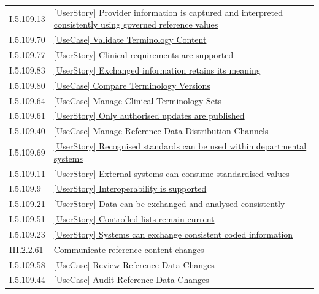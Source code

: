 \begin{longtable}{p{.22\linewidth}p{.73\linewidth}}
I.5.109.13 & \hyperref[element:73ed5dc7bd934953845142a11a9b709e]{[UserStory] Provider information is captured and interpreted consistently using governed reference values} \\
I.5.109.70 & \hyperref[element:7480697092b94fc5a2c8a50901bc6433]{[UseCase] Validate Terminology Content} \\
I.5.109.77 & \hyperref[element:7acf5892e8064dab94e80ca65bb9eb0c]{[UserStory] Clinical requirements are supported} \\
I.5.109.83 & \hyperref[element:7c2a2c1ec7f34479a3bf9ff78955cbb2]{[UserStory] Exchanged information retains its meaning} \\
I.5.109.80 & \hyperref[element:808cc9157f7445e9905cf6b8b00ae91b]{[UseCase] Compare Terminology Versions} \\
I.5.109.64 & \hyperref[element:81f51d06139a483fad1ce27d58d3f257]{[UseCase] Manage Clinical Terminology Sets} \\
I.5.109.61 & \hyperref[element:8354ca7d807b4484affb11c615afd477]{[UserStory] Only authorised updates are published} \\
I.5.109.40 & \hyperref[element:856238ac30b34600a9f77d5163195055]{[UseCase] Manage Reference Data Distribution Channels} \\
I.5.109.69 & \hyperref[element:88e30ac516be4d9abc770930fccb7060]{[UserStory] Recognised standards can be used within departmental systems} \\
I.5.109.11 & \hyperref[element:8a9cb5a23ef943f4ae2d9d3c797c2048]{[UserStory] External systems can consume standardised values} \\
I.5.109.9 & \hyperref[element:8e5fe3a028514bc297def3b1eb1804b4]{[UserStory] Interoperability is supported} \\
I.5.109.21 & \hyperref[element:98256cd240ef490092a130055b79d305]{[UserStory] Data can be exchanged and analysed consistently} \\
I.5.109.51 & \hyperref[element:99f1e86083f8476881a3c8dd2b60b580]{[UserStory] Controlled lists remain current} \\
I.5.109.23 & \hyperref[element:9bddfec7868249dd864bf841f0232be1]{[UserStory] Systems can exchange consistent coded information} \\
III.2.2.61 & \hyperref[element:9faf0704382e4b428814c2e9bf72eec0]{Communicate reference content changes} \\
I.5.109.58 & \hyperref[element:a0976f81267c41ce9d230594af2a66b6]{[UseCase] Review Reference Data Changes} \\
I.5.109.44 & \hyperref[element:a11027ce27df480f8b3c3b02464fab2d]{[UseCase] Audit Reference Data Changes} \\

\end{longtable}
